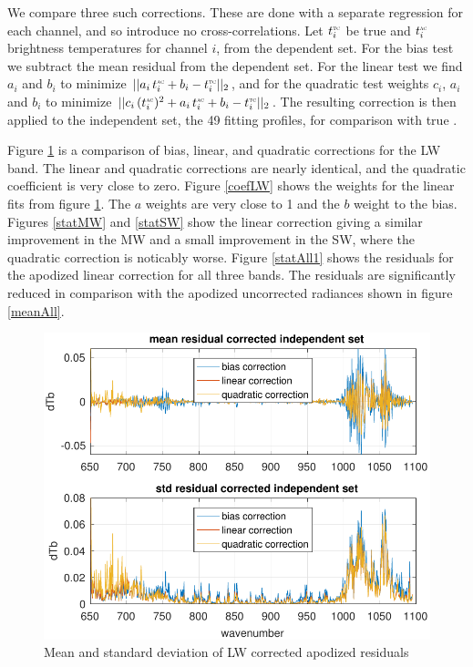 \documentclass[10pt,twocolumn]{article}
\begin{document}
We compare three such corrections.  These are done with a separate
regression for each {\cris} channel, and so introduce no
cross-correlations.  Let $t^{\mbox{\tiny\textsc{tc}}}_i$ be true {\cris} and $t^{\mbox{\tiny\textsc{ac}}}_i$
{\airs} {\cris} brightness temperatures for {\cris} channel $i$,
from the dependent set.  For the bias test we subtract the mean
residual from the dependent set.  For the linear test we find $a_i$
and $b_i$ to minimize $||a_i\,t^{\mbox{\tiny\textsc{ac}}}_i + b_i - t^{\mbox{\tiny\textsc{tc}}}_i||_2$, and for
the quadratic test weights $c_i$, $a_i$ and $b_i$ to minimize
$||c_i\,(t^{\mbox{\tiny\textsc{ac}}}_i)^2 + a_i\,t^{\mbox{\tiny\textsc{ac}}}_i + b_i - t^{\mbox{\tiny\textsc{tc}}}_i||_2$.  The resulting
correction is then applied to the independent set, the 49 fitting
profiles, for comparison with true {\cris}.

Figure \ref{statLW} is a comparison of bias, linear, and quadratic
corrections for the LW band.  The linear and quadratic corrections
are nearly identical, and the quadratic coefficient is very close to
zero.  Figure \ref{coefLW} shows the weights for the linear fits
from figure \ref{statLW}.  The $a$ weights are very close to 1 and
the $b$ weight to the bias.  Figures \ref{statMW} and \ref{statSW}
show the linear correction giving a similar improvement in the MW
and a small improvement in the SW, where the quadratic correction is
noticably worse.  Figure \ref{statAll1} shows the residuals for the
apodized linear correction for all three bands.  The residuals are
significantly reduced in comparison with the apodized uncorrected
radiances shown in figure \ref{meanAll}.

\begin{figure} %
  \centering
  \includegraphics[width=\linewidth]{figures/a2cris_regr_LW.pdf}
  \caption{Mean and standard deviation of LW corrected apodized
    residuals}
  \label{statLW}
\end{figure}
\end{document}
